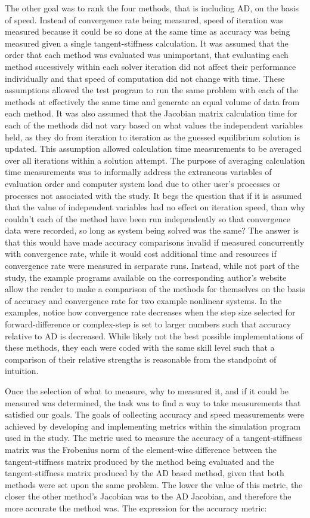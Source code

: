 \documentclass[preprint,12pt]{elsarticle}
\begin{document}
The other goal was to rank the four methods, that is including AD, on the basis of speed. Instead of
convergence rate being measured, speed of iteration was measured because it could be so done at the
same time as accuracy was being measured given a single tangent-stiffness calculation.  It was
assumed that the order that each method was evaluated was unimportant, that evaluating each method
sucessively within each solver iteration did not affect their performance individually and that
speed of computation did not change with time. These assumptions allowed the test program to run the
same problem with each of the methods at effectively the same time and generate an equal volume of
data from each method. It was also assumed that the Jacobian matrix calculation time for each of the
methods did not vary based on what values the independent variables held, as they do from iteration
to iteration as the guessed equilibrium solution is updated.  This assumption allowed calculation
time measurements to be averaged over all iterations within a solution attempt. The purpose of
averaging calculation time measurements was to informally address the extraneous variables of
evaluation order and computer system load due to other user's processes or processes not associated
with the study. It begs the question that if it is assumed that the value of independent variables
had no effect on iteration speed, than why couldn't each of the method have been run independently
so that convergence data were recorded, so long as system being solved was the same? The answer is
that this would have made accuracy comparisons invalid if measured concurrently with convergence
rate, while it would cost additional time and resources if convergence rate were measured in
serparate runs. Instead, while not part of the study, the example programs available on the
corresponding author's website allow the reader to make a comparison of the methods for themselves
on the basis of accuracy and convergence rate for two example nonlinear systems. In the examples,
notice how convergence rate decreases when the step size selected for forward-difference or
complex-step is set to larger numbers such that accuracy relative to AD is decreased. While likely
not the best possible implementations of these methods, they each were coded with the same skill
level such that a comparison of their relative strengths is reasonable from the standpoint of
intuition.

Once the selection of what to measure, why to measured it, and if it could be measured was
determined, the task was to find a way to take measurements that satisfied our goals. The goals of
collecting accuracy and speed measurements were achieved by developing and implementing metrics
within the simulation program used in the study. The metric used to measure the accuracy of a
tangent-stiffness matrix was the Frobenius norm of the element-wise difference between the
tangent-stiffness matrix produced by the method being evaluated and the tangent-stiffness matrix
produced by the AD based method, given that both methods were set upon the same problem. The lower
the value of this metric, the closer the other method's Jacobian was to the AD Jacobian, and
therefore the more accurate the method was. The expression for the accuracy metric:
\end{document}
